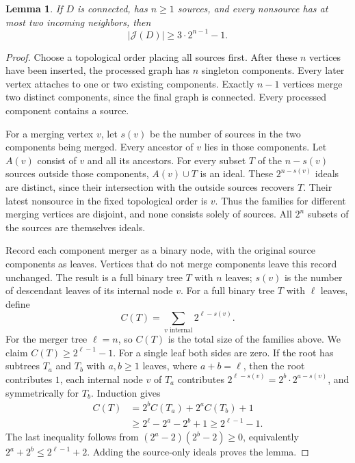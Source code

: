 \documentclass[11pt]{article}
\newtheorem{lemma}[theorem]{Lemma}
\newcommand{\Id}{\mathcal J}
\begin{document}
\begin{lemma}\label{lem:dag}
If $D$ is connected, has $n\ge1$ sources, and every nonsource has at most
two incoming neighbors, then
\[
                         |\Id(D)|\ge3\cdot2^{n-1}-1.
\]
\end{lemma}
\begin{proof}
Choose a topological order placing all sources first. After these $n$
vertices have been inserted, the processed graph has $n$ singleton
components. Every later vertex attaches to one or two existing
components. Exactly $n-1$ vertices merge two distinct components, since
the final graph is connected. Every processed component contains a
source.

For a merging vertex $v$, let $s(v)$ be the number of sources in the two
components being merged. Every ancestor of $v$ lies in those components.
Let $A(v)$ consist of $v$ and all its ancestors. For every subset $T$ of
the $n-s(v)$ sources outside those components, $A(v)\cup T$ is an ideal.
These $2^{n-s(v)}$ ideals are distinct, since their intersection with the
outside sources recovers $T$. Their latest nonsource in the fixed
topological order is $v$. Thus the families for different merging
vertices are disjoint, and none consists solely of sources. All $2^n$
subsets of the sources are themselves ideals.

Record each component merger as a binary node, with the original source
components as leaves. Vertices that do not merge components leave this
record unchanged. The result is a full binary tree $T$ with $n$ leaves;
$s(v)$ is the number of descendant leaves of its internal node $v$.
For a full binary tree $T$ with $\ell$ leaves, define
\[
             C(T)=\sum_{v\text{ internal}}2^{\ell-s(v)}.
\]
For the merger tree $\ell=n$, so $C(T)$ is the total size of the
families above. We claim $C(T)\ge2^{\ell-1}-1$. For a single leaf both
sides are zero. If the root has subtrees $T_a$ and $T_b$ with $a,b\ge1$
leaves, where $a+b=\ell$, then the root contributes $1$, each internal
node $v$ of $T_a$ contributes $2^{\ell-s(v)}=2^b\cdot2^{a-s(v)}$, and
symmetrically for $T_b$. Induction gives
\begin{align*}
 C(T)&=2^bC(T_a)+2^aC(T_b)+1\\
     &\ge2^\ell-2^a-2^b+1
      \ge2^{\ell-1}-1.
\end{align*}
The last inequality follows from $(2^a-2)(2^b-2)\ge0$, equivalently
$2^a+2^b\le2^{\ell-1}+2$. Adding the source-only ideals proves the lemma.
\end{proof}
\end{document}

